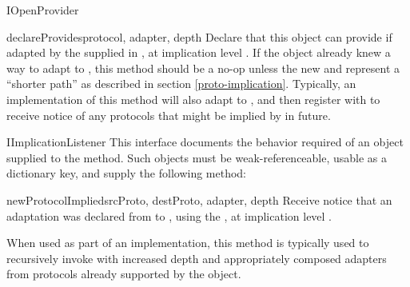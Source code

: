 \begin{verbatim%
}
\begin{verbatim%
}
\begin{verbatim%
}
\begin{verbatim%
}
\begin{verbatim%
}
\begin{verbatim%
}
\begin{classdesc*}{IOpenProvider}
\begin{methoddesc}{declareProvides}{protocol, adapter, depth}
Declare that this object can provide  if adapted by the
 supplied in , at implication level
.  If the object already knew a way to adapt to , this
method should be a no-op unless the new  and  represent
a ``shorter path'' as described in section \ref{proto-implication}.  Typically,
an implementation of this method will also adapt  to
, and then register with 
to receive notice of any protocols that might be implied by 
in future.
\end{methoddesc}

\end{classdesc*}

















\begin{classdesc*}{IImplicationListener}
This interface documents the behavior required of an object supplied to
the  method.  Such objects must
be weak-referenceable, usable as a dictionary key, and supply the following
method:

\begin{methoddesc}{newProtocolImplied}{srcProto, destProto, adapter, depth}
Receive notice that an adaptation was declared from  to
, using the  , at
implication level .

When used as part of an  implementation, this method is
typically used to recursively invoke  with
increased depth and appropriately composed adapters from protocols already
supported by the object.
\end{methoddesc}

\end{classdesc*}
























\end{verbatim%
}
\end{verbatim%
}
\end{verbatim%
}
\end{verbatim%
}
\end{verbatim%
}
\end{verbatim%
}
